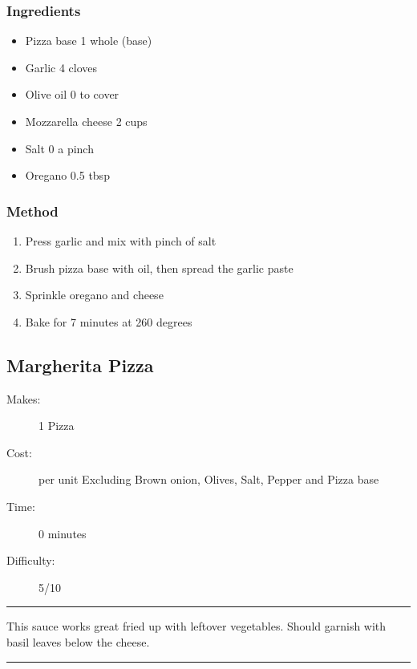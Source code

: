 \documentclass[]{article}
\begin{document}
\subsubsection*{\Large Ingredients}
\begin{multicols}{2}
\begin{itemize}
 \item Pizza base \hfill 1 whole (base)
 \item Garlic \hfill 4 cloves
 \item Olive oil \hfill 0 to cover
 \item Mozzarella cheese \hfill 2 cups
 \item Salt \hfill 0 a pinch
 \item Oregano \hfill 0.5 tbsp
\end{itemize}
\end{multicols}
\subsubsection*{\Large Method}
\begin{enumerate}[font=\huge\color{accent}]
	\item Press garlic and mix with pinch of salt
	\item Brush pizza base with oil, then spread the garlic paste
	\item Sprinkle oregano and cheese
	\item Bake for 7 minutes at 260 degrees
\end{enumerate}
\newpage
{}\label{rec:Margherita Pizza}
\subsection*{\center\huge Margherita Pizza}
\begin{description}
\item[Makes:] 1 Pizza
\item[Cost:]  per unit Excluding Brown onion, Olives, Salt, Pepper and Pizza base
\item[Time:] 0 minutes
\item[Difficulty:] 5/10
\end{description}
\vspace{0.2cm}\hrule\vspace{0.5cm}
\begin{adjustwidth}{0.5 cm}{0.5 cm}

This sauce works great fried up with leftover vegetables. Should garnish with basil leaves below the cheese. \hfill{}\color{black}

\end{adjustwidth}
\vspace{0.5cm}\hrule
\end{document}
